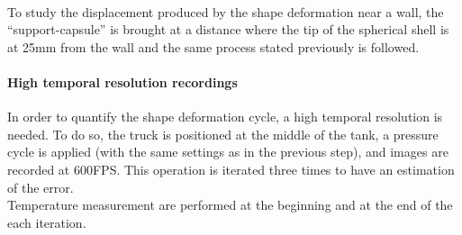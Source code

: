 \paragraph{}
To study the displacement produced by the shape deformation near a wall, the "`support-capsule"' is brought at a distance where the tip of the spherical shell is at 25mm from the wall and the same process stated previously is followed.
\paragraph{High temporal resolution recordings}
In order to quantify the shape deformation cycle, a high temporal resolution is needed. To do so, the truck is positioned at the middle of the tank, a pressure cycle is applied (with the same settings as in the previous step), and images are recorded at 600FPS. This operation is iterated three times to have an estimation of the error. \\
Temperature measurement are performed at the beginning and at the end of the each iteration.

